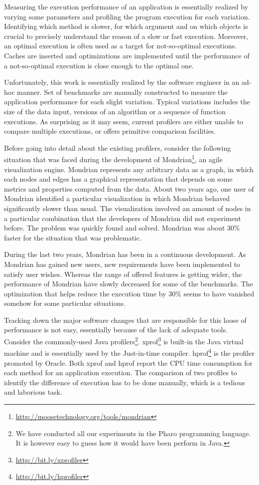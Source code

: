 \documentclass{sig-alternate}
\begin{document}
Measuring the execution performance of an application is essentially realized by varying some parameters and profiling the program execution for each variation. Identifying which method is slower, for which argument and on which objects is crucial to precisely understand the reason of a slow or fast execution. Moreover, an optimal execution is often used as a target for not-so-optimal executions. Caches are inserted and optimizations are implemented until the performance of a not-so-optimal execution is close enough to the optimal one.

Unfortunately, this work is essentially realized by the software engineer in an ad-hoc manner. Set of benchmarks are manually constructed to measure the application performance for each slight variation. Typical variations includes the size of the data input, versions of an algorithm or a sequence of function executions. As surprising as it may seem, 
current profilers are either unable to compare multiple executions, or offers primitive comparison facilities.

Before going into detail about the existing profilers, consider the following situation that was faced during the development of Mondrian\footnote{\url{http://moosetechnology.org/tools/mondrian}}, an agile visualization engine. Mondrian represents any arbitrary data as a graph, in which each nodes and edges has a graphical representation that depends on some metrics and properties computed from the data.
About two years ago, one user of Mondrian identified a particular visualization in which Mondrian behaved significantly slower than usual. The visualization involved an amount of nodes in a particular combination that the developers of Mondrian did not experiment before. The problem was quickly found and solved. Mondrian was about 30\% faster for the situation that was problematic. 

During the last two years, Mondrian has been in a continuous development. As Mondrian has gained new users, new requirements have been implemented to satisfy user wishes. Whereas the range of offered features is getting wider, the performance of Mondrian have slowly decreased for some of the benchmarks. The optimization that helps reduce the execution time by 30\% seems to have vanished somehow for some particular situations. 

Tracking down the major software changes that are responsible for this loose of performance is not easy, essentially because of the lack of adequate tools. Consider the commonly-used Java profilers\footnote{We have conducted all our experiments in the Pharo programming language. It is however easy to guess how it would have been perform in Java.}. xprof\footnote{\url{http://bit.ly/xprofiler}} is built-in the Java virtual machine and is essentially used by the Just-in-time compiler. hprof\footnote{\url{http://bit.ly/hprofiler}} is the profiler promoted by Oracle. Both xprof and hprof report the CPU time consumption for each method for an application execution. The comparison of two profiles to identify the difference of execution has to be done manually, which is a tedious and laborious task.
\end{document}

